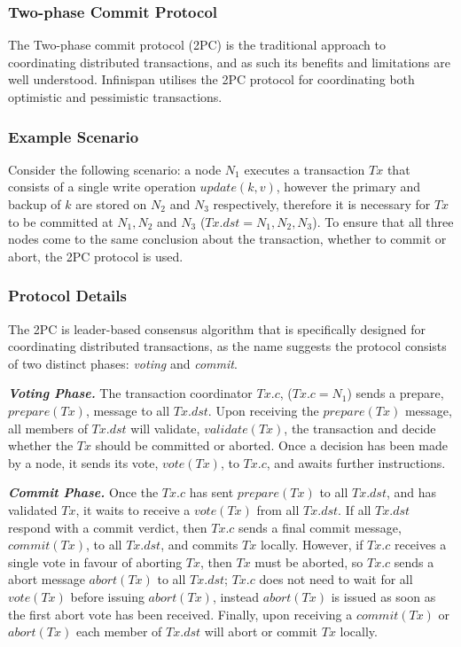         
	    \subsubsection{Two-phase Commit Protocol}\label{ssec:2PC}
	       The Two-phase commit protocol (2PC)\citep{Bernstein:1996:PTP:261193} is the traditional approach to coordinating distributed transactions, and as such its benefits and limitations are well understood.  Infinispan utilises the 2PC protocol for coordinating both optimistic and pessimistic transactions.  
	       
           \subsubsection*{Example Scenario} \label{transaction_scenario} 
           Consider the following scenario: a node $N_1$ executes a transaction $Tx$ that consists of a single write operation $update(k, v)$, however the primary and backup of $k$ are stored on $N_2$ and $N_3$ respectively, therefore it is necessary for $Tx$ to be committed at $N_1, N_2$ and $N_3$ ($Tx.dst = N_1, N_2, N_3$).  To ensure that all three nodes come to the same conclusion about the transaction, whether to commit or abort, the 2PC protocol is used.  
	       
	       \subsubsection*{Protocol Details}
	       The 2PC is leader-based consensus algorithm that is specifically designed for coordinating distributed transactions, as the name suggests the protocol consists of two distinct phases: \emph{voting} and \emph{commit}. 
	       
	       \textbf{\emph{Voting Phase.}} The transaction coordinator $Tx.c$, ($Tx.c = N_1$) sends a prepare, $prepare(Tx)$, message to all $Tx.dst$.  Upon receiving the $prepare(Tx)$ message, all members of $Tx.dst$ will validate, $validate(Tx)$, the transaction and decide whether the $Tx$ should be committed or aborted.  Once a decision has been made by a node, it sends its vote, $vote(Tx)$, to $Tx.c$, and awaits further instructions.  
	       
	       \textbf{\emph{Commit Phase.}}  Once the $Tx.c$ has sent $prepare(Tx)$ to all $Tx.dst$, and has validated $Tx$, it waits to receive a $vote(Tx)$ from all $Tx.dst$.  If all $Tx.dst$ respond with a commit verdict, then $Tx.c$ sends a final commit message, $commit(Tx)$, to all $Tx.dst$, and commits $Tx$ locally.  However, if $Tx.c$ receives a single vote in favour of aborting $Tx$, then $Tx$ must be aborted, so $Tx.c$ sends a abort message $abort(Tx)$ to all $Tx.dst$; $Tx.c$ does not need to wait for all $vote(Tx)$ before issuing $abort(Tx)$, instead $abort(Tx)$ is issued as soon as the first abort vote has been received.  Finally, upon receiving a $commit(Tx)$ or $abort(Tx)$ each member of $Tx.dst$ will abort or commit $Tx$ locally.  
	       
